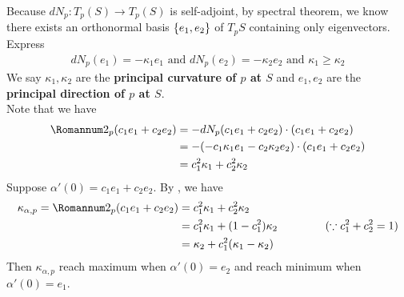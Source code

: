 \documentclass{report}
\begin{document}
\begin{mdframed}
Because $dN_p:T_p(S)\rightarrow T_p(S)$ is self-adjoint, by spectral theorem, we know there exists an orthonormal basis $\{ e_1,e_2 \}$ of $T_pS$ containing only eigenvectors. Express 
\begin{align*}
  dN_p(e_1)=-\kappa_1 e_1\text{ and }dN_p(e_2)=-\kappa _2 e_2\text{ and }\kappa_1 \geq \kappa_2
\end{align*}
We say $\kappa_1,\kappa_2$ are the \textbf{principal curvature of $p$ at  $S$} and $e_1,e_2$ are the  \textbf{principal direction of $p$ at  $S$}.\\




Note that we have  
\begin{align*}
\Sec_p(c_1e_1+c_2e_2)&=-dN_p(c_1e_1+c_2e_2)\cdot (c_1e_1+c_2e_2)\\
&=-(-c_1\kappa_1 e_1-c_2\kappa_2 e_2)\cdot (c_1e_1+c_2e_2)\\
&=c_1^2 \kappa_1 + c_2^2\kappa_2
\end{align*}
Suppose $\alpha '(0)=c_1e_1+c_2e_2$. By , we have
\begin{align*}
\kappa_{\alpha ,p} = \Sec_p(c_1e_1+c_2e_2)&=c_1^2 \kappa_1 +c_2^2 \kappa_2\\
&=c_1^2 \kappa_1 + (1-c_1^2)\kappa_2\hspace{1.5cm}(\because c_1^2+c_2^2=1)\\
&= \kappa_2 + c_1^2 (\kappa_1-\kappa_2)
\end{align*}
Then $\kappa_{\alpha ,p}$ reach maximum when $\alpha '(0)=e_2$ and reach minimum when $\alpha '(0)=e_1$.\\ 
\end{mdframed}
\end{document}
